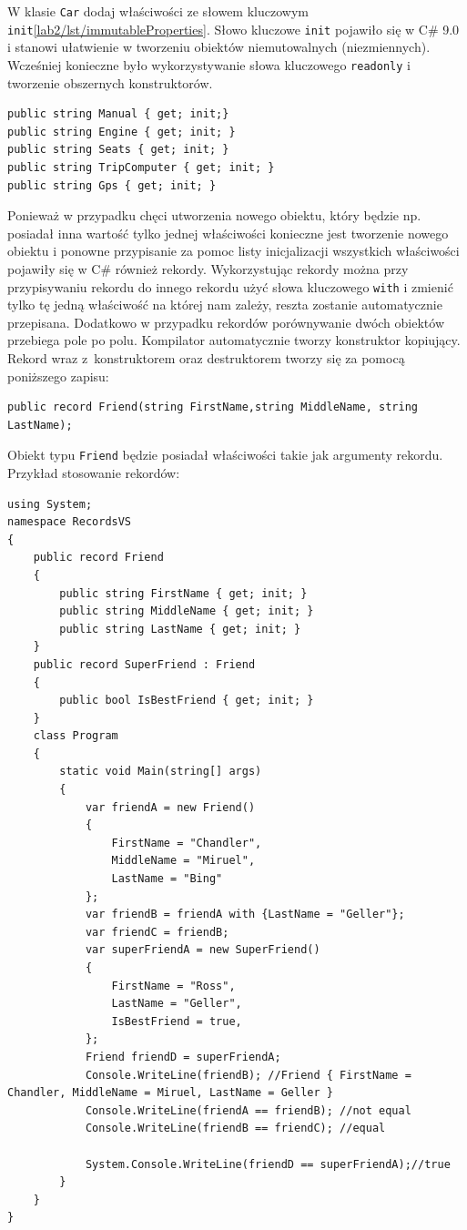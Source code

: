 W klasie \texttt{Car} dodaj właściwości ze słowem kluczowym \texttt{init}\ref{lab2/lst/immutableProperties}. Słowo kluczowe \texttt{init} pojawiło się w C\# 9.0 i stanowi ułatwienie w tworzeniu obiektów niemutowalnych (niezmiennych). Wcześniej konieczne było wykorzystywanie słowa kluczowego \texttt{readonly} i tworzenie obszernych konstruktorów.
\begin{lstlisting}[caption={Inicjalizacja obiektu klasy \texttt{Car} ze niemutowalnymi właściwościami}, label={lab2/lst/immutableProperties}]
public string Manual { get; init;}
public string Engine { get; init; }
public string Seats { get; init; }
public string TripComputer { get; init; }
public string Gps { get; init; }
\end{lstlisting}
Ponieważ w przypadku chęci utworzenia nowego obiektu, który będzie np. posiadał inna wartość tylko jednej właściwości konieczne jest tworzenie nowego obiektu i ponowne przypisanie za pomoc listy inicjalizacji wszystkich właściwości pojawiły się w C\# również rekordy. Wykorzystując rekordy można przy przypisywaniu rekordu do innego rekordu użyć słowa kluczowego \texttt{with} i zmienić tylko tę jedną właściwość na której nam zależy, reszta zostanie automatycznie przepisana. Dodatkowo w przypadku rekordów porównywanie dwóch obiektów przebiega pole po polu. Kompilator automatycznie tworzy konstruktor kopiujący. Rekord wraz z~konstruktorem oraz destruktorem tworzy się za pomocą poniższego zapisu:
\begin{lstlisting}
public record Friend(string FirstName,string MiddleName, string LastName);
\end{lstlisting}
Obiekt typu \texttt{Friend} będzie posiadał właściwości takie jak argumenty rekordu.
Przykład stosowanie rekordów:
\begin{lstlisting}
using System;
namespace RecordsVS
{
	public record Friend
	{
		public string FirstName { get; init; }
		public string MiddleName { get; init; }   
		public string LastName { get; init; }        
	}
	public record SuperFriend : Friend
	{
		public bool IsBestFriend { get; init; }
	}
	class Program
	{
		static void Main(string[] args)
		{
			var friendA = new Friend()
			{
				FirstName = "Chandler",
				MiddleName = "Miruel",
				LastName = "Bing"
			};
			var friendB = friendA with {LastName = "Geller"};
			var friendC = friendB;
			var superFriendA = new SuperFriend()
			{
				FirstName = "Ross",
				LastName = "Geller",
				IsBestFriend = true,
			};
			Friend friendD = superFriendA;
			Console.WriteLine(friendB); //Friend { FirstName = Chandler, MiddleName = Miruel, LastName = Geller }
			Console.WriteLine(friendA == friendB); //not equal
			Console.WriteLine(friendB == friendC); //equal
			
			System.Console.WriteLine(friendD == superFriendA);//true
		}
	}
}
\end{lstlisting}

